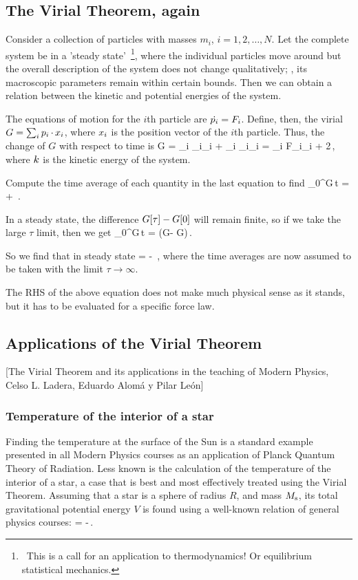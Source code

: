 \subsection{The Virial Theorem, again}
Consider a collection of particles with masses $m_i$, $i = 1,2,\dotsc,N$. Let the complete system be in a 'steady state'~\footnote{~This is a call for an application to thermodynamics! Or equilibrium statistical mechanics.}, where the individual particles move around but the overall description of the system does not change qualitatively; \ie, its macroscopic parameters remain within certain bounds. Then we can obtain a relation between the kinetic and potential energies of the system.

The equations of motion for the $i$th particle are $\dot{p_i} = F_i$. Define, then, the virial $G = \sum_ip_i\operatorname{\cdot} x_i$, where $x_i$ is the position vector of the $i$th particle. Thus, the change of $G$ with respect to time is
\beq
\dt G = \sum_i \dt\lmom_i\iprod\pvec_i + \sum_i \lmom_i\iprod\dt\pvec_i 
      = \sum_i F_i\iprod\pvec_i + 2\ken\,,
\eeq
where $k$ is the kinetic energy of the system.

Compute the time average of each quantity in the last equation to find
\beq
{}\int_0^\tau \dt G\,\dx t = \avg{2\ken} + \,.
\eeq

In a steady state, the difference $G\!\left[{\tau}\right] - G\!\left[{0}\right]$ will remain finite, so if we take the large $\tau$ limit, then we get
\beq
{}\int_0^\tau \dt G\,\dx t = \left(G\vat\tau - G\right)\,.
\eeq

So we find that in steady state
\ken = - \,,
\eeq
where the time averages are now assumed to be taken with the limit $\tau\to\infty$.

The RHS of the above equation does not make much physical sense as it stands, but it has to be evaluated for a specific force law.


\subsection{Applications of the Virial Theorem}
[The Virial Theorem and its applications in the teaching of Modern Physics, Celso L. Ladera, Eduardo Alomá y Pilar León]


\subsubsection{Temperature of the interior of a star}
Finding the temperature at the surface of the Sun is a standard example presented in all Modern Physics courses as an application of Planck Quantum Theory of Radiation. Less known is the calculation of the temperature of the interior of a star, a case that is best and most effectively treated using the Virial Theorem. Assuming that a star is a sphere of radius $R$, and mass $M_\text{s}$, its total gravitational potential energy $V$ is found using a well-known relation of general physics courses:
\beq
\pen = -\,.
\eeq

